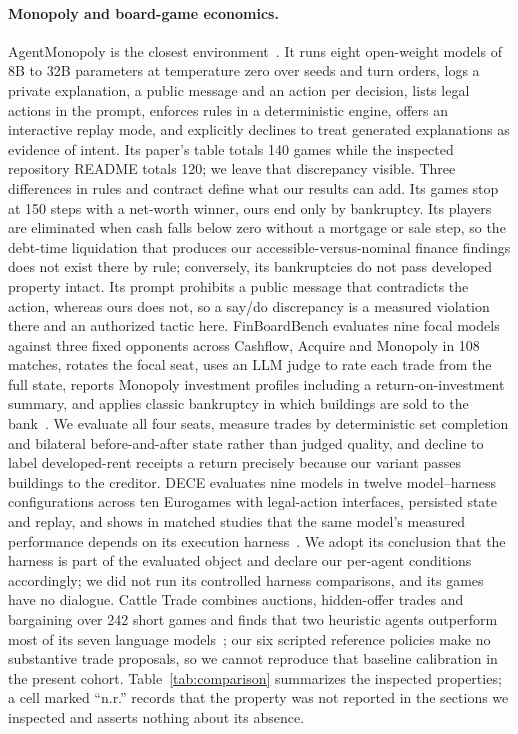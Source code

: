 \paragraph{Monopoly and board-game economics.} AgentMonopoly is the closest environment~\cite{wu2026agentmonopoly,agentmonopoly2026repo}. It runs eight open-weight models of 8B to 32B parameters at temperature zero over seeds and turn orders, logs a private explanation, a public message and an action per decision, lists legal actions in the prompt, enforces rules in a deterministic engine, offers an interactive replay mode, and explicitly declines to treat generated explanations as evidence of intent. Its paper's table totals 140 games while the inspected repository README totals 120; we leave that discrepancy visible. Three differences in rules and contract define what our results can add. Its games stop at 150 steps with a net-worth winner, ours end only by bankruptcy. Its players are eliminated when cash falls below zero without a mortgage or sale step, so the debt-time liquidation that produces our accessible-versus-nominal finance findings does not exist there by rule; conversely, its bankruptcies do not pass developed property intact. Its prompt prohibits a public message that contradicts the action, whereas ours does not, so a say/do discrepancy is a measured violation there and an authorized tactic here. FinBoardBench evaluates nine focal models against three fixed opponents across Cashflow, Acquire and Monopoly in 108 matches, rotates the focal seat, uses an LLM judge to rate each trade from the full state, reports Monopoly investment profiles including a return-on-investment summary, and applies classic bankruptcy in which buildings are sold to the bank~\cite{hu2026finboardbench}. We evaluate all four seats, measure trades by deterministic set completion and bilateral before-and-after state rather than judged quality, and decline to label developed-rent receipts a return precisely because our variant passes buildings to the creditor. DECE evaluates nine models in twelve model--harness configurations across ten Eurogames with legal-action interfaces, persisted state and replay, and shows in matched studies that the same model's measured performance depends on its execution harness~\cite{zhang2026dece}. We adopt its conclusion that the harness is part of the evaluated object and declare our per-agent conditions accordingly; we did not run its controlled harness comparisons, and its games have no dialogue. Cattle Trade combines auctions, hidden-offer trades and bargaining over 242 short games and finds that two heuristic agents outperform most of its seven language models~\cite{muller2026cattletrade}; our six scripted reference policies make no substantive trade proposals, so we cannot reproduce that baseline calibration in the present cohort. Table~\ref{tab:comparison} summarizes the inspected properties; a cell marked ``n.r.'' records that the property was not reported in the sections we inspected and asserts nothing about its absence.

